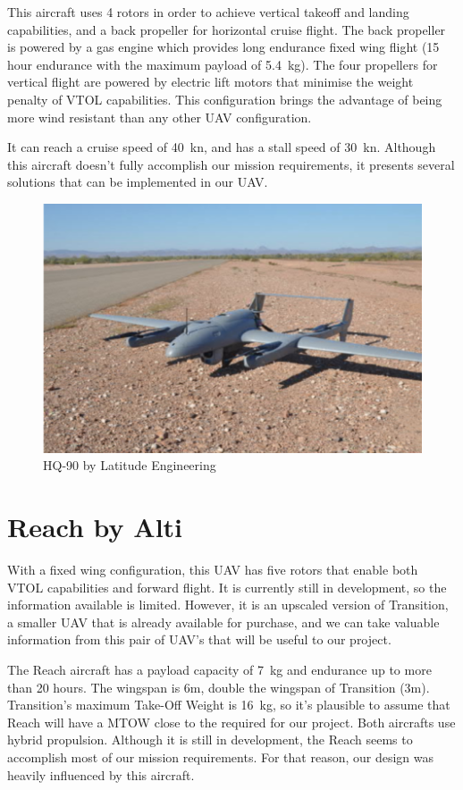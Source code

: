 \documentclass[english,fira]{ist-report}
\begin{document}
This aircraft uses 4 rotors in order to achieve vertical takeoff and landing capabilities, and a back propeller for horizontal cruise flight.\cite{hquad} The back propeller is powered by a gas engine which provides long endurance fixed wing flight (15 hour endurance with the maximum payload of \SI{5.4}{\kilo\gram}). The four propellers for vertical flight are powered by electric lift motors that minimise the weight penalty of VTOL capabilities. This configuration brings the advantage of being more wind resistant than any other UAV configuration. \par
It can reach a cruise speed of \SI{40}{\knot}, and has a stall speed of \SI{30}{\knot}. Although this aircraft doesn’t fully accomplish our mission requirements, it presents several solutions that can be implemented in our UAV. 
\begin{figure}[ht]
    \centering
    \includegraphics[width = 0.6\linewidth]{graphics/MarketOverview/HQ-90.png}
    \caption{HQ-90 by Latitude Engineering}
    \label{fig:hq90}
\end{figure}

\section{Reach by Alti}

With a fixed wing configuration, this UAV has five rotors that enable both VTOL capabilities and forward flight.\cite{reach} It is currently still in development, so the information available is limited. However, it is an upscaled version of Transition, a smaller UAV that is already available for purchase, and we can take valuable information from this pair of UAV’s that will be useful to our project. \par
The Reach aircraft has a payload capacity of \SI{7}{\kilo\gram} and endurance up to more than 20 hours. The wingspan is 6m, double the wingspan of Transition (3m). Transition’s maximum Take-Off Weight is \SI{16}{\kilo\gram}, so it's plausible to assume that Reach will have a MTOW close to the required for our project. Both aircrafts use hybrid propulsion. 
Although it is still in development, the Reach seems to accomplish most of our mission requirements. For that reason, our design was heavily influenced by this aircraft.
\end{document}
